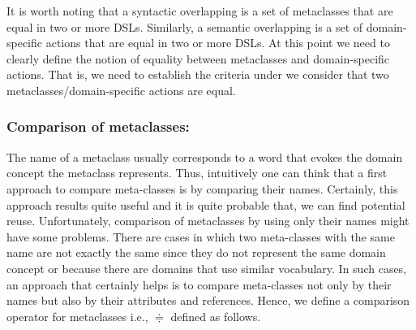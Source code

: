 

It is worth noting that a syntactic overlapping is a set of metaclasses that are equal in two or more DSLs. Similarly, a semantic overlapping is a set of domain-specific actions that are equal in two or more DSLs. At this point we need to clearly define the notion of equality between metaclasses and domain-specific actions. That is, we need to establish the criteria under we consider that two metaclasses/domain-specific actions are equal.

\vspace{-3mm}
\subsubsection{Comparison of metaclasses:} The name of a metaclass usually corresponds to a word that evokes the domain concept the metaclass represents. Thus, intuitively one can think that a first approach to compare meta-classes is by comparing their names. Certainly, this approach results quite useful and it is quite probable that, we can find potential reuse. Unfortunately, comparison of metaclasses by using only their names might have some problems. There are cases in which two meta-classes with the same name are not exactly the same since they do not represent the same domain concept or because there are domains that use similar vocabulary. In such cases, an approach that certainly helps is to compare meta-classes not only by their names but also by their attributes and references. Hence, we define a comparison operator for metaclasses i.e., $\doteqdot $ defined as follows.


